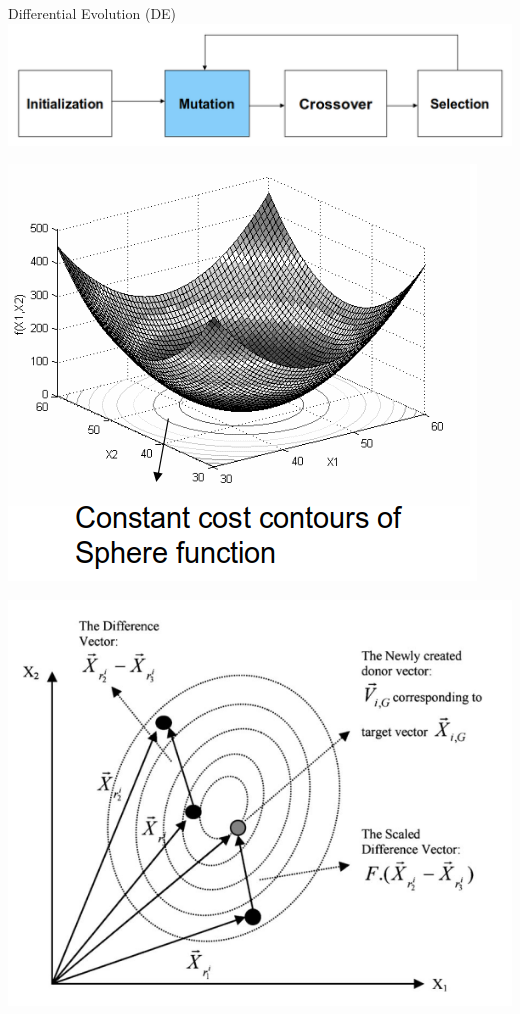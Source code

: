 \begin{frame}{Differential Evolution (DE)}
\centering
\includegraphics[width=1.0\textwidth]{new_images/DE4.png}\\
\begin{minipage}{0.43\textwidth}
\includegraphics[width=\textwidth]{new_images/DE6.png}
\end{minipage}
\begin{minipage}{0.49\textwidth}
\includegraphics[width=\textwidth]{new_images/DE7.png}
\end{minipage}
\end{frame}

